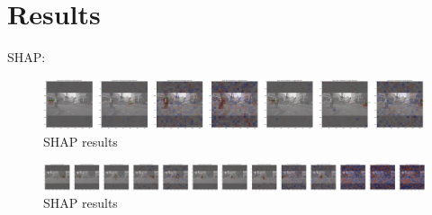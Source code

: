 \section{Results}\label{sec:results}
SHAP:
\begin{figure}[h]
\includegraphics[width=1.0\textwidth]{figures/output1}
\caption{SHAP results}\label{fig:SHAP_results1}
\end{figure}
\begin{figure}[h]
\includegraphics[width=1.0\textwidth]{figures/output}
\caption{SHAP results}\label{fig:SHAP_results2}
\end{figure}

